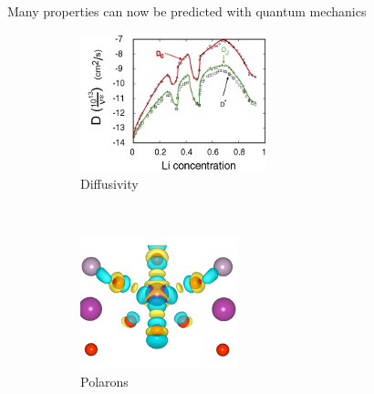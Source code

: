 \documentclass[aspectratio=169]{beamer}
\begin{document}
\begin{frame}{Many properties can now be predicted with quantum mechanics}
\begin{figure}
\begin{subfigure}{0.2\textwidth}
        \includegraphics[width=\linewidth]{lectures/figures/1_Diffusivity.jpg}
    \caption{Diffusivity\cite{vandervenLithiumDiffusionLayered2000}}
    \end{subfigure}\\
    \begin{subfigure}{0.2\textwidth}
        \includegraphics[width=\linewidth]{lectures/figures/1_polarons.png}
    \caption{Polarons\cite{ongComparisonSmallPolaron2011}}
    \end{subfigure}
        \begin{subfigure}{0.2\textwidth}

\end{subfigure}
\end{figure}
\end{frame}
\end{document}
